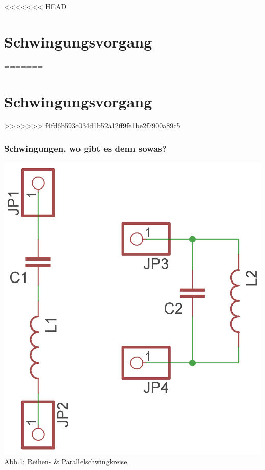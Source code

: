 

\subtitle{Technik Klasse E 07: \\
          Schwingkreise \& Filter \\[2em]}
\date{Stand 10.11.2015}


<<<<<<< HEAD
\section*{Schwingungs\-vorgang}
=======

\section*{Schwingungsvorgang}
>>>>>>> f4fd6b593c034d1b52a12ff9fe1be2f7900a89c5
\begin{frame}
\frametitle{Schwingungen, wo gibt es denn sowas?}
	\begin{center}
		\includegraphics[width=\textwidth,height=.8\textheight,keepaspectratio]{e07/Schwingkreise.png}\\
		Abb.1: Reihen- \& Parallelschwingkreise
	\end{center}
\end{frame}

